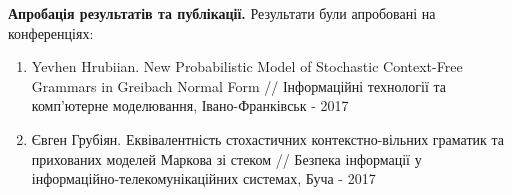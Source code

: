 \textbf{Апробація результатів та публікації.} Результати були апробовані на конференціях:\\
\begin{enumerate}
  \item Yevhen Hrubiian. New Probabilistic Model of Stochastic Context-Free Grammars in Greibach Normal Form // Інформаційні технології
та комп’ютерне моделювання, Івано-Франківськ - 2017
  \item Євген Грубіян. Еквівалентність стохастичних контекстно-вільних граматик та прихованих моделей Маркова зі стеком // Безпека інформації у інформаційно-телекомунікаційних системах, Буча - 2017
\end{enumerate}

